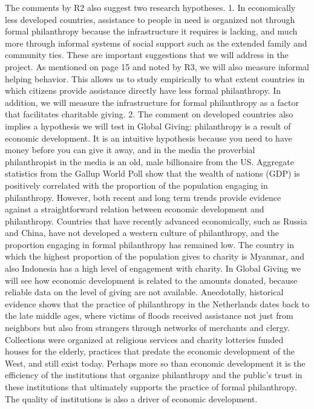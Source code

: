\documentclass[twocolumn, serif, rga, numeric]{jote-article}
\begin{document}
The comments by R2 also suggest two research hypotheses.
1.	In economically less developed countries, assistance to people in need is organized not through formal philanthropy because the infrastructure it requires is lacking, and much more through informal systems of social support such as the extended family and community ties. These are important suggestions that we will address in the project. As mentioned on page 15 and noted by R3, we will also measure informal helping behavior. This allows us to study empirically to what extent countries in which citizens provide assistance directly have less formal philanthropy. In addition, we will measure the infrastructure for formal philanthropy as a factor that facilitates charitable giving.
2.	The comment on developed countries also implies a hypothesis we will test in Global Giving: philanthropy is a result of economic development. It is an intuitive hypothesis because you need to have money before you can give it away, and in the media the proverbial philanthropist in the media is an old, male billionaire from the US. Aggregate statistics from the Gallup World Poll show that the wealth of nations (GDP) is positively correlated with the proportion of the population engaging in philanthropy.
However, both recent and long term trends provide evidence against a straightforward relation between economic development and philanthropy. Countries that have recently advanced economically, such as Russia and China, have not developed a western culture of philanthropy, and the proportion engaging in formal philanthropy has remained low. The country in which the highest proportion of the population gives to charity is Myanmar, and also Indonesia has a high level of engagement with charity. In Global Giving we will see how economic development is related to the amounts donated, because reliable data on the level of giving are not available. Anecdotally, historical evidence shows that the practice of philanthropy in the Netherlands dates back to the late middle ages, where victims of floods received assistance not just from neighbors but also from strangers through networks of merchants and clergy. Collections were organized at religious services and charity lotteries funded houses for the elderly, practices that predate the economic development of the West, and still exist today. Perhaps more so than economic development it is the efficiency of the institutions that organize philanthropy and the public’s trust in these institutions that ultimately supports the practice of formal philanthropy. The quality of institutions is also a driver of economic development.
\end{document}
